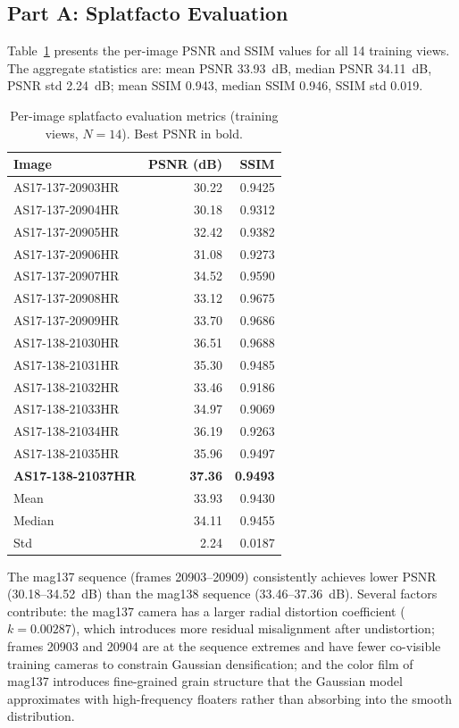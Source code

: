 \documentclass[12pt]{article}
\begin{document}
\subsection{Part A: Splatfacto Evaluation}

Table~\ref{tab:psnr_per_image} presents the per-image PSNR and SSIM values for all 14 training views. The aggregate statistics are: mean PSNR 33.93~dB, median PSNR 34.11~dB, PSNR std 2.24~dB; mean SSIM 0.943, median SSIM 0.946, SSIM std 0.019.

\begin{table}[H]
\centering
\caption{Per-image splatfacto evaluation metrics (training views, $N{=}14$). Best PSNR in bold.}
\label{tab:psnr_per_image}
\begin{tabular}{lrr}
\toprule
Image & PSNR (dB) & SSIM \\
\midrule
AS17-137-20903HR & 30.22 & 0.9425 \\
AS17-137-20904HR & 30.18 & 0.9312 \\
AS17-137-20905HR & 32.42 & 0.9382 \\
AS17-137-20906HR & 31.08 & 0.9273 \\
AS17-137-20907HR & 34.52 & 0.9590 \\
AS17-137-20908HR & 33.12 & 0.9675 \\
AS17-137-20909HR & 33.70 & 0.9686 \\
AS17-138-21030HR & 36.51 & 0.9688 \\
AS17-138-21031HR & 35.30 & 0.9485 \\
AS17-138-21032HR & 33.46 & 0.9186 \\
AS17-138-21033HR & 34.97 & 0.9069 \\
AS17-138-21034HR & 36.19 & 0.9263 \\
AS17-138-21035HR & 35.96 & 0.9497 \\
\textbf{AS17-138-21037HR} & \textbf{37.36} & \textbf{0.9493} \\
\midrule
Mean & 33.93 & 0.9430 \\
Median & 34.11 & 0.9455 \\
Std & 2.24 & 0.0187 \\
\bottomrule
\end{tabular}
\end{table}

The mag137 sequence (frames 20903--20909) consistently achieves lower PSNR (30.18--34.52~dB) than the mag138 sequence (33.46--37.36~dB). Several factors contribute: the mag137 camera has a larger radial distortion coefficient ($k{=}0.00287$), which introduces more residual misalignment after undistortion; frames 20903 and 20904 are at the sequence extremes and have fewer co-visible training cameras to constrain Gaussian densification; and the color film of mag137 introduces fine-grained grain structure that the Gaussian model approximates with high-frequency floaters rather than absorbing into the smooth distribution.
\end{document}
